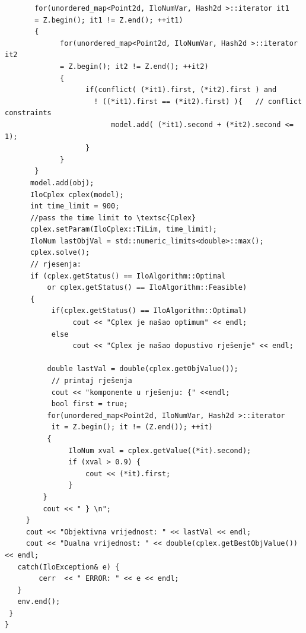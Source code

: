 \documentclass[a4paper, utf8, 11pt, colorlinks]{book}
\theoremstyle{definition}
\begin{document}
\begin{verbatim}
       for(unordered_map<Point2d, IloNumVar, Hash2d >::iterator it1 
       = Z.begin(); it1 != Z.end(); ++it1)
       {
	         for(unordered_map<Point2d, IloNumVar, Hash2d >::iterator it2 
	         = Z.begin(); it2 != Z.end(); ++it2)
	         {
		           if(conflict( (*it1).first, (*it2).first ) and  
		             ! ((*it1).first == (*it2).first) ){   // conflict constraints
			             model.add( (*it1).second + (*it2).second <= 1);
		           }
	         }
       }
      model.add(obj);
      IloCplex cplex(model);
      int time_limit = 900;
      //pass the time limit to \textsc{Cplex}
      cplex.setParam(IloCplex::TiLim, time_limit); 
      IloNum lastObjVal = std::numeric_limits<double>::max();
      cplex.solve();  
      // rjesenja:
      if (cplex.getStatus() == IloAlgorithm::Optimal 
          or cplex.getStatus() == IloAlgorithm::Feasible)
      {
    	   if(cplex.getStatus() == IloAlgorithm::Optimal)
    	        cout << "Cplex je našao optimum" << endl;
    	   else
    	        cout << "Cplex je našao dopustivo rješenje" << endl;
    	      
    	  double lastVal = double(cplex.getObjValue());
    	   // printaj rješenja
    	   cout << "komponente u rješenju: {" <<endl;
    	   bool first = true;
    	  for(unordered_map<Point2d, IloNumVar, Hash2d >::iterator
    	   it = Z.begin(); it != (Z.end()); ++it)
    	  {
               IloNum xval = cplex.getValue((*it).second);
    	       if (xval > 0.9) {
                   cout << (*it).first;
    	       }
         }
         cout << " } \n";  
     }
     cout << "Objektivna vrijednost: " << lastVal << endl;
     cout << "Dualna vrijednost: " << double(cplex.getBestObjValue()) << endl;
   catch(IloException& e) {
     	cerr  << " ERROR: " << e << endl;
   }
   env.end();
 }
} 
\end{verbatim}

\end{document}
